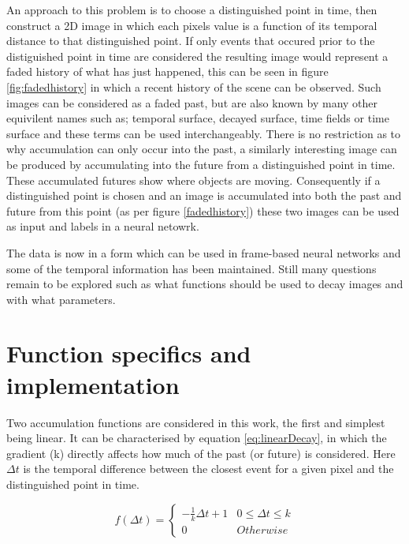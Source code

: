 An approach to this problem is to choose a distinguished point in time, then construct a 2D image in which each pixels value is a function of its temporal distance to that distinguished point.
If only events that occured prior to the distiguished point in time are considered the resulting image would represent a faded history of what has just happened, this can be seen in figure \ref{fig:fadedhistory} in which a recent history of the scene can be observed. 
Such images can be considered as a faded past, but are also known by many other equivilent names such as; temporal surface, decayed surface, time fields or time surface and these terms can be used interchangeably. 
There is no restriction as to why accumulation can only occur into the past, a similarly interesting image can be produced by accumulating into the future from a distinguished point in time.
These accumulated futures show where objects are moving. 
Consequently if a distinguished point is chosen and an image is accumulated into both the past and future from this point (as per figure \ref{fadedhistory}) these two images can be used as input and labels in a neural netowrk. 


The data is now in a form which can be used in frame-based neural networks and some of the temporal information has been maintained.
Still many questions remain to be explored such as what functions should be used to decay images and with what parameters.


\section{Function specifics and implementation}

Two accumulation functions are considered in this work, the first and simplest being linear. 
It can be characterised by equation \ref{eq:linearDecay}, in which the gradient (k) directly affects how much of the past (or future) is considered. 
Here $\Delta t$ is the temporal difference between the closest event for a given pixel and the distinguished point in time. 


\begin{equation}
 \label{eq:linearDecay}
    f(\Delta t) = 
    \begin{cases}
    -\frac{1}{k}  \Delta t + 1 & 0\leq \Delta t \leq k \\
    0 & Otherwise
   \end{cases}
\end{equation}

